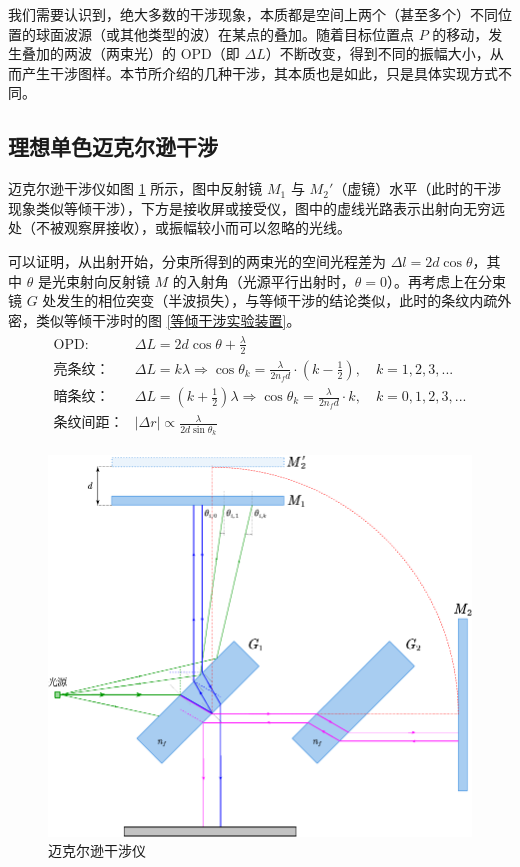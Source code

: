 \documentclass[UTF8]{report}
\theoremstyle{MyLineTheoremStyle} %
\theoremstyle{MyBlockTheoremStyle} %
\theoremstyle{MySubsubsectionStyle} %
\begin{document}
我们需要认识到，绝大多数的干涉现象，本质都是空间上两个（甚至多个）不同位置的球面波源（或其他类型的波）在某点的叠加。随着目标位置点 $P$ 的移动，发生叠加的两波（两束光）的 OPD（即 $\Delta L$）不断改变，得到不同的振幅大小，从而产生干涉图样。本节所介绍的几种干涉，其本质也是如此，只是具体实现方式不同。

\subsection{理想单色迈克尔逊干涉}

迈克尔逊干涉仪如图 \ref{迈克尔逊干涉仪} 所示，图中反射镜 $M_1$ 与 $M_2'$（虚镜）水平（此时的干涉现象类似等倾干涉），下方是接收屏或接受仪，图中的虚线光路表示出射向无穷远处（不被观察屏接收），或振幅较小而可以忽略的光线。

可以证明，从出射开始，分束所得到的两束光的空间光程差为 $\Delta l = 2 d \cos \theta$，其中 $\theta$ 是光束射向反射镜 $M$ 的入射角（光源平行出射时，$\theta = 0$）。再考虑上在分束镜 $G$ 处发生的相位突变（半波损失），与等倾干涉的结论类似，此时的条纹内疏外密，类似等倾干涉时的图 \ref{等倾干涉实验装置}。
\begin{align}
\begin{matrix}
\displaystyle \text{OPD: }& \Delta L = 2 d \cos \theta + \frac{\lambda}{2} \\ 
\displaystyle \text{亮条纹：}&\Delta L = k \lambda \Longrightarrow \cos \theta_k = \frac{\lambda}{2 n_f d} \cdot (k - \frac{1}{2}),\quad k = 1, 2, 3, ... \\ 
\displaystyle \text{暗条纹：}&\Delta L = (k + \frac{1}{2}) \lambda \Longrightarrow \cos \theta_k = \frac{\lambda}{2 n_f d} \cdot k,\quad k = 0, 1, 2, 3, ...\\ 
\displaystyle \text{条纹间距：}& | \Delta r | \propto  \frac{\lambda}{2d \sin \theta_k}
\end{matrix}
\end{align}


\begin{figure}[H]\centering
    \includegraphics[width=0.8\columnwidth]{assets/3/迈克尔逊干涉仪.pdf}
    \caption{ 迈克尔逊干涉仪}\label{迈克尔逊干涉仪}
\end{figure}
\end{document}
